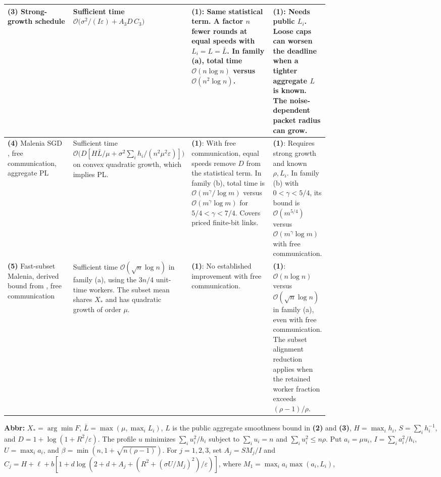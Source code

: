 \begin{table}[tp]
\begin{threeparttable}
\begin{tabularx}{\linewidth}{@{}>{\raggedright\arraybackslash}p{0.21\linewidth}>{\raggedright\arraybackslash}p{0.26\linewidth}>{\raggedright\arraybackslash}p{0.27\linewidth}>{\raggedright\arraybackslash}X@{}}
\midrule
\textbf{(3)} Strong-growth schedule \citep{dlsgStrongGrowthTime}
& Sufficient time $\mathcal{O}\bigl(\sigma^2/(I\varepsilon)+A_3D\,C_3\bigr)$
& \textbf{(1)}: Same statistical term. A factor $n$ fewer rounds at equal speeds with $L_i=L=\bar L$. In family (a), total time $\mathcal{O}(n\log n)$ versus $\mathcal{O}(n^2\log n)$.
& \textbf{(1)}: Needs public $L_i$. Loose caps can worsen the deadline when a tighter aggregate $L$ is known. The noise-dependent packet radius can grow. \\
\midrule
\textbf{(4)} Malenia SGD \citep[Thm.~F.2]{dwiTyurin2026v1}, free communication, aggregate PL
& Sufficient time $\mathcal{O}\bigl(D[H\bar L/\mu+\sigma^2\sum_i h_i/(n^2\mu^2\varepsilon)]\bigr)$ on convex quadratic growth, which implies PL.
& \textbf{(1)}: With free communication, equal speeds remove $D$ from the statistical term. In family (b), total time is $\mathcal{O}(m^\gamma/\log m)$ versus $\mathcal{O}(m^\gamma\log m)$ for $5/4<\gamma<7/4$. Covers priced finite-bit links.
& \textbf{(1)}: Requires strong growth and known $\rho,L_i$. In family (b) with $0<\gamma<5/4$, its bound is $\mathcal{O}(m^{5/4})$ versus $\mathcal{O}(m^\gamma\log m)$ with free communication. \\
\midrule
\textbf{(5)} Fast-subset Malenia, derived bound from \citep[Thm.~F.2]{dwiTyurin2026v1}, free communication
& Sufficient time $\mathcal{O}(\sqrt n\log n)$ in family (a), using the $3n/4$ unit-time workers. The subset mean shares $X_*$ and has quadratic growth of order $\mu$.
& \textbf{(1)}: No established improvement with free communication.
& \textbf{(1)}: $\mathcal{O}(n\log n)$ versus $\mathcal{O}(\sqrt n\log n)$ in family (a), even with free communication. The subset alignment reduction applies when the retained worker fraction exceeds $(\rho-1)/\rho$. \\
\bottomrule
\end{tabularx}
\begin{tablenotes}[flushleft]\footnotesize
\item[] \textbf{Abbr:} $X_*=\arg\min F$, $\bar L=\max(\mu,\max_i L_i)$, $L$ is the public aggregate smoothness bound in \textbf{(2)} and \textbf{(3)}, $H=\max_i h_i$, $S=\sum_i h_i^{-1}$, and $D=1+\log(1+R^2/\varepsilon)$. The profile $u$ minimizes $\sum_i u_i^2/h_i$ subject to $\sum_i u_i=n$ and $\sum_i u_i^2\le n\rho$. Put $a_i=\mu u_i$, $I=\sum_i a_i^2/h_i$, $U=\max_i a_i$, and $\beta=\min(n,1+\sqrt{n(\rho-1)})$.
For $j=1,2,3$, set $A_j=SM_j/I$ and
$C_j=H+\ell+b[1+d\log(2+d+A_j+(R^2+(\sigma U/M_j)^2)/\varepsilon)]$,
where $M_1=\max_i a_i\max(a_i,L_i)$,

\end{tablenotes}
\end{threeparttable}
\end{table}
